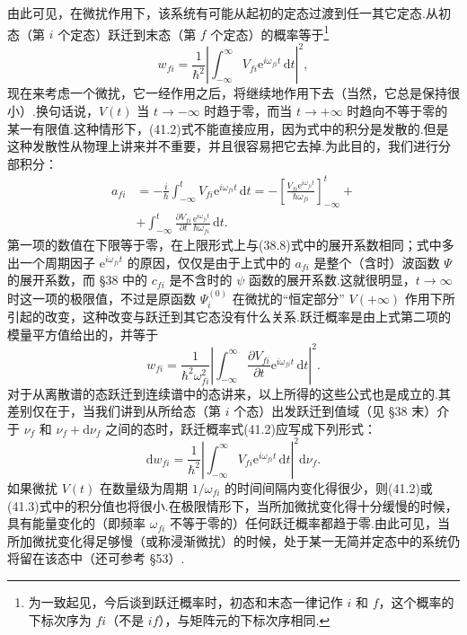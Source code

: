 由此可见，在微扰作用下，该系统有可能从起初的定态过渡到任一其它定态.从初态（第 $i$ 个定态）跃迁到末态（第 $f$ 个定态）的概率等于\footnote{为一致起见，今后谈到跃迁概率时，初态和末态一律记作 $i$ 和 $f$，这个概率的下标次序为 $fi$（不是 $if$），与矩阵元的下标次序相同.}
\begin{equation}
  w_{fi}=\frac{1}{\hbar^2}\left|\int_{-\infty}^{\infty}V_{fi}\mathrm{e}^{i\omega_{fi}t}\,\mathrm{d}t\right|^2,
\end{equation}
现在来考虑一个微扰，它一经作用之后，将继续地作用下去（当然，它总是保持很小）.换句话说，$V(t)$ 当 $t\to-\infty$ 时趋于零，而当 $t\to+\infty$ 时趋向不等于零的某一有限值.这种情形下，(41.2)式不能直接应用，因为式中的积分是发散的.但是这种发散性从物理上讲来并不重要，并且很容易把它去掉.为此目的，我们进行分部积分：
\begin{equation*}
\begin{aligned}
  a_{fi}&=-\frac{i}{\hbar}\int_{-\infty}^{t}V_{fi}\mathrm{e}^{i\omega_{fi}t}\,\mathrm{d}t
  =-\left[\frac{V_{fi}\mathrm{e}^{i\omega_{fi}t}}{\hbar\omega_{fi}}\right]_{-\infty}^{t}+\\
  &+\int_{-\infty}^{t}\frac{\partial V_{fi}}{\partial t}
  \frac{\mathrm{e}^{i\omega_{fi}t}}{\hbar\omega_{fi}}\,\mathrm{d}t.
\end{aligned}
\end{equation*}
第一项的数值在下限等于零，在上限形式上与(38.8)式中的展开系数相同；式中多出一个周期因子 $\mathrm{e}^{i\omega_{fi}t}$ 的原因，仅仅是由于上式中的 $a_{fi}$ 是整个（含时）波函数 $\varPsi$ 的展开系数，而 §38 中的 $c_{fi}$ 是不含时的 $\psi$ 函数的展开系数.这就很明显，$t\to\infty$ 时这一项的极限值，不过是原函数 $\varPsi_i^{(0)}$ 在微扰的“恒定部分” $V(+\infty)$ 作用下所引起的改变，这种改变与跃迁到其它态没有什么关系.跃迁概率是由上式第二项的模量平方值给出的，并等于
\begin{equation}
  w_{fi}=\frac{1}{\hbar^2\omega_{fi}^2}
  \left|\int_{-\infty}^{\infty}\frac{\partial V_{fi}}{\partial t}
  \mathrm{e}^{i\omega_{fi}t}\,\mathrm{d}t\right|^2.
\end{equation}
对于从离散谱的态跃迁到连续谱中的态讲来，以上所得的这些公式也是成立的.其差别仅在于，当我们讲到从所给态（第 $i$ 个态）出发跃迁到值域（见 §38 末）介于 $\nu_f$ 和 $\nu_f+\mathrm{d}\nu_f$ 之间的态时，跃迁概率式(41.2)应写成下列形式：
\begin{equation}
  \mathrm{d}w_{fi}=\frac{1}{\hbar^2}
  \left|\int_{-\infty}^{\infty}V_{fi}\mathrm{e}^{i\omega_{fi}t}\,\mathrm{d}t\right|^2
  \mathrm{d}\nu_f.
\end{equation}
如果微扰 $V(t)$ 在数量级为周期 $1/\omega_{fi}$ 的时间间隔内变化得很少，则(41.2)或(41.3)式中的积分值也将很小.在极限情形下，当所加微扰变化得十分缓慢的时候，具有能量变化的（即频率 $\omega_{fi}$ 不等于零的）任何跃迁概率都趋于零.由此可见，当所加微扰变化得足够慢（或称浸渐微扰）的时候，处于某一无简并定态中的系统仍将留在该态中（还可参考 §53）.

